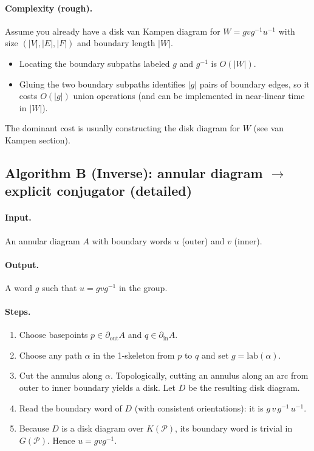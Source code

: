 \documentclass[11pt]{article}
\theoremstyle{definition}
\theoremstyle{plain}
\theoremstyle{remark}
\newcommand{\lab}{\mathrm{lab}}
\begin{document}
\paragraph{Complexity (rough).}\cite{lyndonschupp1977}
Assume you already have a disk van Kampen diagram for $W=gvg^{-1}u^{-1}$ with size $(|V|,|E|,|F|)$ and boundary length $|W|$.
\begin{itemize}[leftmargin=2em]
\item Locating the boundary subpaths labeled $g$ and $g^{-1}$ is $O(|W|)$.
\item Gluing the two boundary subpaths identifies $|g|$ pairs of boundary edges, so it costs $O(|g|)$ union operations (and can be implemented in near-linear time in $|W|$).
\end{itemize}
The dominant cost is usually constructing the disk diagram for $W$ (see van Kampen section).


\subsection*{Algorithm B (Inverse): annular diagram $\to$ explicit conjugator (detailed)}\cite{lyndonschupp1977}
\paragraph{Input.} An annular diagram $A$ with boundary words $u$ (outer) and $v$ (inner).
\paragraph{Output.} A word $g$ such that $u=gvg^{-1}$ in the group.

\paragraph{Steps.}
\begin{enumerate}[leftmargin=2.2em]
\item Choose basepoints $p\in\partial_{\mathrm{out}}A$ and $q\in\partial_{\mathrm{in}}A$.
\item Choose any path $\alpha$ in the 1-skeleton from $p$ to $q$ and set $g=\lab(\alpha)$.
\item Cut the annulus along $\alpha$. Topologically, cutting an annulus along an arc from outer to inner boundary yields a disk.
Let $D$ be the resulting disk diagram.
\item Read the boundary word of $D$ (with consistent orientations): it is $g\,v\,g^{-1}\,u^{-1}$.
\item Because $D$ is a disk diagram over $K(\mathcal P)$, its boundary word is trivial in $G(\mathcal P)$.
Hence $u=gvg^{-1}$.
\end{enumerate}
\end{document}
